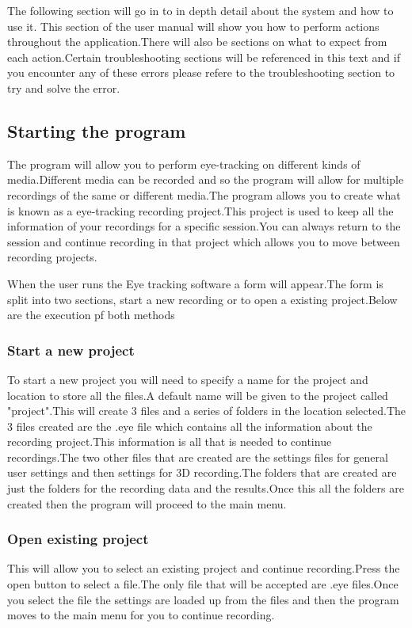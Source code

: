 The following section will go in to in depth detail about the system and how to use it. This section of the user manual will show you how to perform actions throughout the application.There will also be sections on what to expect from each action.Certain troubleshooting sections will be referenced in this text and if you encounter any of these errors please refere to the troubleshooting section to try and solve the error.

\subsection{Starting the program}
The program will allow you to perform eye-tracking on different kinds of media.Different media can be recorded and so the program will allow for multiple recordings of the same or different media.The program allows you to create what is known as a eye-tracking recording project.This project is used to keep all the information of your recordings for a specific session.You can always return to the session and continue recording in that project which allows you to move between recording projects.\newline

 When the user runs the Eye tracking software a form will appear.The form is split into two sections, start a new recording or to open a existing project.Below are the execution pf both methods

\subsubsection{Start a new project} 
To start a new project you will need to specify a name for the project and location to store all the files.A default name will be given to the project called "project".This will create 3 files and a series of folders in the location selected.The 3 files created are the .eye file which contains all the information about the recording project.This information is all that is needed to continue recordings.The two other files that are created are the settings files for general user settings and then settings for 3D recording.The folders that are created are just the folders for the recording data and the results.Once this all the folders are created then the program will proceed to the main menu.
\subsubsection{Open existing project} 
This will allow you to select an existing project and continue recording.Press the open button to select a file.The only file that will be accepted are .eye files.Once you select the file the settings are loaded up from the files and then the program moves to the main menu for you to continue recording.
